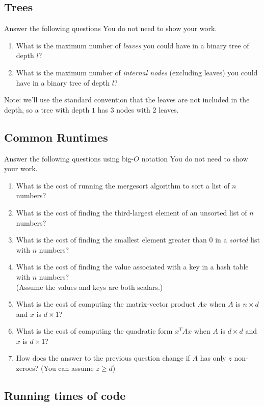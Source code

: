 \documentclass{article}
\def\blu#1{{\color{blu}#1}}
\begin{document}
\subsection{Trees}

\blu{Answer the following questions} You do not need to show your work.
\begin{enumerate}
\item What is the maximum number of \emph{leaves} you could have in a binary tree of depth $l$?
\item What is the maximum number of \emph{internal nodes} (excluding leaves) you could have in a binary tree of depth $l$?
\end{enumerate}
Note: we'll use the standard convention that the leaves are not included in the depth, so a tree with depth $1$ has 3 nodes with 2 leaves.


\subsection{Common Runtimes}

\blu{Answer the following questions using big-$O$ notation} You do not need to show your work.
\begin{enumerate}
\item What is the cost of running the mergesort algorithm to sort  a list of $n$ numbers?
\item What is the cost of finding the third-largest element of an unsorted list of $n$ numbers?
\item What is the cost of finding the smallest element greater than 0 in a \emph{sorted} list with $n$ numbers?
\item What is the cost of finding the value associated with a key in a hash table with $n$ numbers? \\(Assume the values and keys are both scalars.)
\item What is the cost of computing the matrix-vector product $Ax$ when $A$ is $n \times d$ and $x$ is $d \times 1$?
\item What is the cost of computing the quadratic form $x^TAx$ when $A$ is $d \times d$ and $x$ is $d \times 1$?
\item How does the answer to the previous question change if $A$ has only $z$ non-zeroes? (You can assume $z \geq d$)
\end{enumerate}

\subsection{Running times of code}
\end{document}
